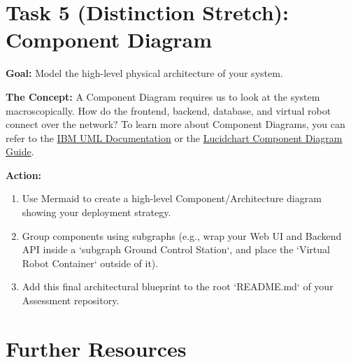 \documentclass[a4paper,12pt]{article}
\begin{document}

\section*{Task 5 (Distinction Stretch): Component Diagram}

\textbf{Goal:} Model the high-level physical architecture of your system.

\textbf{The Concept:} A Component Diagram requires us to look at the system macroscopically. How do the frontend, backend, database, and virtual robot connect over the network? To learn more about Component Diagrams, you can refer to the \href{https://www.ibm.com/docs/en/rational-soft-arch/9.7.0?topic=diagrams-component}{IBM UML Documentation} or the \href{https://www.lucidchart.com/pages/uml-component-diagram}{Lucidchart Component Diagram Guide}.

\vspace{0.3cm}
\textbf{Action:}
\begin{enumerate}
    \item Use Mermaid to create a high-level Component/Architecture diagram showing your deployment strategy.
    \item Group components using subgraphs (e.g., wrap your Web UI and Backend API inside a `subgraph Ground Control Station`, and place the `Virtual Robot Container` outside of it).
    \item Add this final architectural blueprint to the root `README.md` of your Assessment repository.
\end{enumerate}


\section*{Further Resources}
\end{document}
